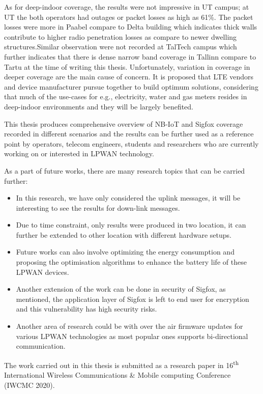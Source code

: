 \documentclass[12pt]{article}
\begin{document}
As for deep-indoor coverage, the results were not impressive in UT campus; at UT the both operators had outages or packet losses as high as 61\%. The packet losses were more in Paabel compare to Delta  building which indicates thick walls contribute to higher radio penetration losses as compare to newer dwelling structures.Similar observation were not recorded at TalTech campus which further indicates that there is dense narrow band coverage in Tallinn compare to Tartu at the time of writing this thesis. Unfortunately, variation in coverage in deeper coverage are the main cause of concern. It is proposed that LTE vendors and device manufacturer pursue together to build optimum solutions, considering that much of the use-cases for e.g., electricity, water and gas meters resides in deep-indoor environments and they will be largely benefited. 


This thesis produces comprehensive overview of NB-IoT and Sigfox coverage recorded in different scenarios and the results  can  be  further  used as a reference point by operators, telecom engineers, students and researchers who are currently working on or interested in LPWAN technology.\par 

As a part of future works, there are many research topics that can be carried further:
\begin{itemize}
    \item In this research, we have only considered the uplink messages, it will be interesting to see the results for down-link messages.
    \item Due to time constraint, only results were produced in two location, it can further be extended to other location with different hardware setups.
    \item Future works can also involve optimizing the energy consumption and proposing the optimisation algorithms to enhance the battery life of these LPWAN devices.
    \item Another extension of the work can be done in security of Sigfox, as mentioned, the application layer of Sigfox is left to end user for encryption and this vulnerability has high security risks. 
    \item Another area of research could be with over the air firmware updates for various LPWAN technologies as most popular ones supports bi-directional communication.

\end{itemize}


The work carried out in this thesis is submitted as a research paper in 16\textsuperscript{th} International  Wireless Communications \& Mobile computing Conference (IWCMC 2020).
\end{document}
